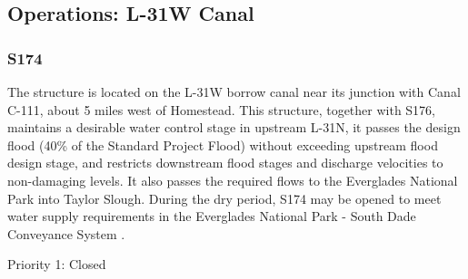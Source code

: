 
\clearpage
\subsection{Operations: L-31W Canal}

\subsubsection{S174}

The structure is located on the L-31W borrow canal near its junction with Canal C-111, about 5 miles west of Homestead. This structure, together with S176, maintains a desirable water control stage in upstream L-31N, it passes the design flood (40\% of the Standard Project Flood) without exceeding upstream flood design stage, and restricts downstream flood stages and discharge velocities to non-damaging levels. It also passes the required flows to the Everglades National Park into Taylor Slough. During the dry period, S174 may be opened to meet water supply requirements in the Everglades National Park - South Dade Conveyance System \cite{corp2005, SFWMD1994}.

\begin{packed_items}
\item Priority 1: Closed
\end{packed_items}


